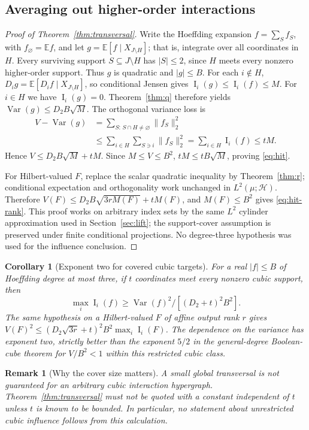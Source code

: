 \documentclass[11pt,letterpaper]{article}
\newtheorem{corollary}[theorem]{Corollary}
\newtheorem{remark}[theorem]{Remark}
\theoremstyle{definition}
\newcommand{\E}{\mathbb E}
\newcommand{\Var}{\operatorname{Var}}
\newcommand{\Inf}{\operatorname{I}}
\begin{document}
\subsection{Averaging out higher-order interactions}
\begin{proof}[Proof of Theorem~\ref{thm:transversal}]
Write the Hoeffding expansion $f=\sum_S f_S$, with $f_\varnothing=\E f$,
and let $g=\E[f\mid X_{J\setminus H}]$; that is, integrate over all
coordinates in $H$. Every surviving support $S\subseteq J\setminus H$
has $|S|\le2$, since $H$ meets every nonzero higher-order support.
Thus $g$ is quadratic and $|g|\le B$. For each $i\notin H$,
$D_i g=\E[D_i f\mid X_{J\setminus H}]$, so conditional Jensen gives
$\Inf_i(g)\le\Inf_i(f)\le M$. For $i\in H$ we have $\Inf_i(g)=0$.
Theorem~\ref{thm:q} therefore yields $\Var(g)\le D_2B\sqrt M$.
The orthogonal variance loss is
\[
\begin{split}
V-\Var(g)
 &=\sum_{S:\,S\cap H\ne\varnothing}\|f_S\|_2^2\\
 &\le\sum_{i\in H}\sum_{S\ni i}\|f_S\|_2^2
 =\sum_{i\in H}\Inf_i(f)\le tM.
\end{split}
\]
Hence $V\le D_2B\sqrt M+tM$. Since $M\le V\le B^2$,
$tM\le tB\sqrt M$, proving \eqref{eq:hit}.

For Hilbert-valued $F$, replace the scalar quadratic inequality by
Theorem~\ref{thm:r}; conditional expectation and orthogonality work
unchanged in $L^2(\mu;\mathcal H)$. Therefore
$V(F)\le D_2B\sqrt{3rM(F)}+tM(F)$, and $M(F)\le B^2$ gives
\eqref{eq:hit-rank}. This proof works on arbitrary index sets by the
same $L^2$ cylinder approximation used in
Section~\ref{sec:lift}; the support-cover assumption is preserved
under finite conditional projections. No degree-three hypothesis was
used for the influence conclusion.
\end{proof}

\begin{corollary}[Exponent two for covered cubic targets]\label{cor:cubic}
For a real $|f|\le B$ of Hoeffding degree at most three, if $t$
coordinates meet every nonzero cubic support, then
\[\max_i\Inf_i(f)\ge\Var(f)^2/[(D_2+t)^2B^2].\]
The same hypothesis on a Hilbert-valued $F$ of affine output rank $r$
gives $V(F)^2\le(D_2\sqrt{3r}+t)^2B^2\max_i\Inf_i(F)$.
The dependence on the variance has exponent two, strictly better than
the exponent $5/2$ in the general-degree Boolean-cube theorem for
$V/B^2<1$ \emph{within this restricted cubic class}.
\end{corollary}

\begin{remark}[Why the cover size matters]
A small global transversal is not guaranteed for an arbitrary cubic
interaction hypergraph. Theorem~\ref{thm:transversal} must not be
quoted with a constant independent of $t$ unless $t$ is known to be
bounded. In particular, no statement about unrestricted cubic
influence follows from this calculation.
\end{remark}
\end{document}

